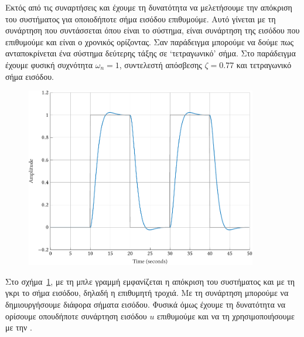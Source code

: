 Εκτός από τις συναρτήσεις  και  έχουμε τη δυνατότητα να
μελετήσουμε την απόκριση του συστήματος για οποιοδήποτε σήμα εισόδου επιθυμούμε.
Αυτό γίνεται με τη συνάρτηση  που συντάσσεται
όπου  είναι το σύστημα,  είναι συνάρτηση της εισόδου που
επιθυμούμε και  είναι ο χρονικός ορίζοντας. Σαν παράδειγμα μπορούμε να
δούμε πως ανταποκρίνεται ένα σύστημα δεύτερης τάξης σε
\enquote*{τετραγωνικό} σήμα.
\eng{}
Στο παράδειγμα έχουμε φυσική συχνότητα \( \omega_n = 1 \), συντελεστή
απόσβεσης \( \zeta = 0.77 \) και τετραγωνικό σήμα εισόδου.
\begin{figure}[h]
    \centering
    \includegraphics[width=0.9\textwidth]{figures/prelim7.pdf}
    \label{fig:prelim7}
\end{figure}
Στο σχήμα~\ref{fig:prelim7}, με τη μπλε γραμμή εμφανίζεται η απόκριση του
συστήματος και με τη γκρι το σήμα εισόδου, δηλαδή η επιθυμητή τροχιά. Με τη
συνάρτηση  μπορούμε να δημιουργήσουμε διάφορα σήματα εισόδου.
Φυσικά όμως έχουμε τη δυνατότητα να ορίσουμε οπουδήποτε συνάρτηση
εισόδου \( u \) επιθυμούμε και να τη χρησιμοποιήσουμε με την .

